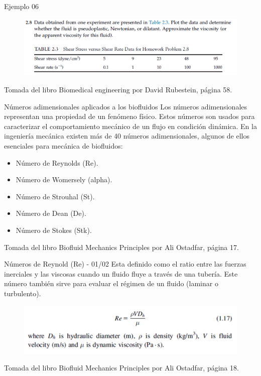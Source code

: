 \begin{frame}{Ejemplo 06}
\justifying
\begin{figure}[H]
\centering
\includegraphics[scale=0.55]{Section_Files/picmanuel/37.png}
\label{fig: Figura2-30}
\end{figure}
{\tiny Tomada del libro Biomedical engineering por David Rubestein, página 58.}
\end{frame}

\begin{frame}{Números adimensionales aplicados a los biofluidos}
\justifying
Los números adimensionales representan una propiedad de un fenómeno físico. Estos números son usados para caracterizar el comportamiento mecánico de un flujo en condición dinámica. En la ingeniería mecánica existen más de 40 números adimensionales, algunos de ellos esenciales para mecánica de biofluidos:
\begin{itemize}
\item Número de Reynolds (Re).
\item Número de Womersely (alpha).
\item Número de Strouhal (St).
\item Número de Dean (De).
\item Número de Stokes (Stk).
\end{itemize}
{\tiny Tomada del libro Biofluid Mechanics Principles por Ali Ostadfar, página 17.}
\end{frame}

\begin{frame}{Números de Reynold (Re) - 01/02}
\justifying
Esta definido como el ratio entre las fuerzas inerciales y las viscosas cuando un fluido fluye a través de una tubería. Este número también sirve para evaluar el régimen de un fluido (laminar o turbulento).
\begin{figure}[H]
\centering
\includegraphics[scale=0.55]{Section_Files/picmanuel/38.png}
\label{fig: Figura2-31}
\end{figure}
{\tiny Tomada del libro Biofluid Mechanics Principles por Ali Ostadfar, página 18.}
\end{frame}

